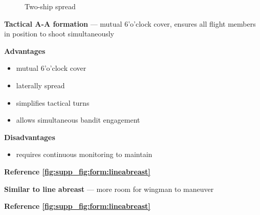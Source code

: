 \begin{figure}[htbp]
\begin{minipage}[b]{0.45\textwidth}
        \caption{Two-ship spread}
        \label{fig:supp_fig:form:spread}
    \end{minipage}
\end{figure}

\begin{tcoloritemize}
    \textbf{Tactical A-A formation} --- mutual 6'o'clock cover, ensures all flight members in position to shoot simultaneously
    \medskip

    \textbf{Advantages}
    \begin{itemize}
        \item mutual 6'o'clock cover
        \item laterally spread
        \item simplifies tactical turns
        \item allows simultaneous bandit engagement
    \end{itemize}

    \textbf{Disadvantages}
    \begin{itemize}
        \item requires continuous monitoring to maintain
    \end{itemize}

    \hfill\textbf{Reference \cref{fig:supp_fig:form:lineabreast}}

    \blueitem[Spread]
    \textbf{Similar to line abreast} --- more room for wingman to maneuver

    \hfill\textbf{Reference \cref{fig:supp_fig:form:lineabreast}}
\end{tcoloritemize}



\clearpage